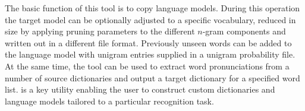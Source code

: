 %
%
%

\newpage
{}


The basic function of this tool is to copy language models. During this
operation the target model can be optionally adjusted to a specific vocabulary,
reduced in size by applying pruning parameters to the different $n$-gram
components and written out in a different file format. Previously unseen words
can be added to the language model with unigram entries supplied in a unigram
probability file. 
At the same time, the tool can be used to extract word pronunciations from a
number of source dictionaries and output a target dictionary for a specified word
list.  is a key utility enabling the user to construct custom 
dictionaries and language models tailored to a particular recognition task.


